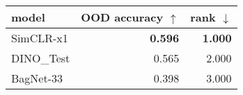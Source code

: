 \begin{tabular}{lrr}
\toprule
     model & OOD accuracy $\uparrow$ & rank $\downarrow$ \\
\midrule
 SimCLR-x1 &          \textbf{0.596} &    \textbf{1.000} \\
DINO\_Test &                   0.565 &             2.000 \\
 BagNet-33 &                   0.398 &             3.000 \\
\bottomrule
\end{tabular}

